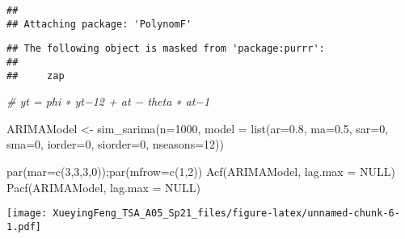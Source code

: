 \documentclass[
]{article}
\newenvironment{Shaded}{\begin{snugshade}}{\end{snugshade}}
\newcommand{\AttributeTok}[1]{\textcolor[rgb]{0.77,0.63,0.00}{#1}}
\newcommand{\CommentTok}[1]{\textcolor[rgb]{0.56,0.35,0.01}{\textit{#1}}}
\newcommand{\ConstantTok}[1]{\textcolor[rgb]{0.00,0.00,0.00}{#1}}
\newcommand{\DecValTok}[1]{\textcolor[rgb]{0.00,0.00,0.81}{#1}}
\newcommand{\FloatTok}[1]{\textcolor[rgb]{0.00,0.00,0.81}{#1}}
\newcommand{\FunctionTok}[1]{\textcolor[rgb]{0.00,0.00,0.00}{#1}}
\newcommand{\NormalTok}[1]{#1}
\newcommand{\OtherTok}[1]{\textcolor[rgb]{0.56,0.35,0.01}{#1}}
\begin{document}
\begin{verbatim}
## 
## Attaching package: 'PolynomF'
\end{verbatim}

\begin{verbatim}
## The following object is masked from 'package:purrr':
## 
##     zap
\end{verbatim}

\begin{Shaded}
\begin{Highlighting}[]
\CommentTok{\# yt = phi ∗ yt−12 + at − theta ∗ at−1}

\NormalTok{ARIMAModel }\OtherTok{\textless{}{-}} \FunctionTok{sim\_sarima}\NormalTok{(}\AttributeTok{n=}\DecValTok{1000}\NormalTok{, }\AttributeTok{model =} \FunctionTok{list}\NormalTok{(}\AttributeTok{ar=}\FloatTok{0.8}\NormalTok{, }\AttributeTok{ma=}\FloatTok{0.5}\NormalTok{, }\AttributeTok{sar=}\DecValTok{0}\NormalTok{, }\AttributeTok{sma=}\DecValTok{0}\NormalTok{, }\AttributeTok{iorder=}\DecValTok{0}\NormalTok{, }\AttributeTok{siorder=}\DecValTok{0}\NormalTok{, }\AttributeTok{nseasons=}\DecValTok{12}\NormalTok{))}

\FunctionTok{par}\NormalTok{(}\AttributeTok{mar=}\FunctionTok{c}\NormalTok{(}\DecValTok{3}\NormalTok{,}\DecValTok{3}\NormalTok{,}\DecValTok{3}\NormalTok{,}\DecValTok{0}\NormalTok{));}\FunctionTok{par}\NormalTok{(}\AttributeTok{mfrow=}\FunctionTok{c}\NormalTok{(}\DecValTok{1}\NormalTok{,}\DecValTok{2}\NormalTok{))}
\FunctionTok{Acf}\NormalTok{(ARIMAModel, }\AttributeTok{lag.max =} \ConstantTok{NULL}\NormalTok{)}
\FunctionTok{Pacf}\NormalTok{(ARIMAModel, }\AttributeTok{lag.max =} \ConstantTok{NULL}\NormalTok{)}
\end{Highlighting}
\end{Shaded}

\texttt{[image: XueyingFeng\_TSA\_A05\_Sp21\_files/figure-latex/unnamed-chunk-6-1.pdf]}
\end{document}
